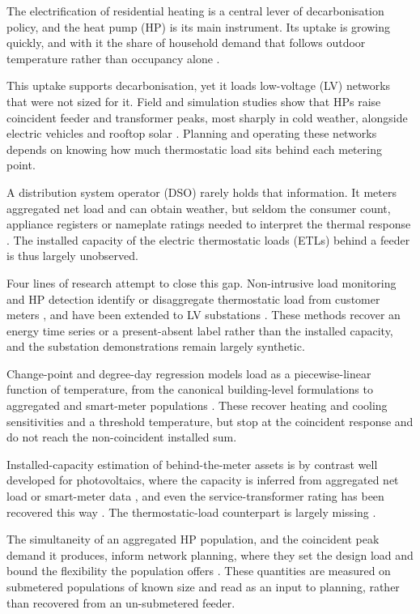 \documentclass[9pt,journal,a4]{IEEEtran}
\begin{document}
The electrification of residential heating is a central lever of decarbonisation policy, and the heat pump (HP) is its main instrument. Its uptake is growing quickly, and with it the share of household demand that follows outdoor temperature rather than occupancy alone \cite{Vel11, Akm14}.

This uptake supports decarbonisation, yet it loads low-voltage (LV) networks that were not sized for it. Field and simulation studies show that HPs raise coincident feeder and transformer peaks, most sharply in cold weather, alongside electric vehicles and rooftop solar \cite{Akm14, Som21, Bec24, Lia26}. Planning and operating these networks depends on knowing how much thermostatic load sits behind each metering point.

A distribution system operator (DSO) rarely holds that information. It meters aggregated net load and can obtain weather, but seldom the consumer count, appliance registers or nameplate ratings needed to interpret the thermal response \cite{Gou26}. The installed capacity of the electric thermostatic loads (ETLs) behind a feeder is thus largely unobserved.

Four lines of research attempt to close this gap. Non-intrusive load monitoring and HP detection identify or disaggregate thermostatic load from customer meters \cite{Fei13, Wei20b, Ray19, Bru23, Gis26}, and have been extended to LV substations \cite{Wan20, Oma24}. These methods recover an energy time series or a present-absent label rather than the installed capacity, and the substation demonstrations remain largely synthetic.

Change-point and degree-day regression models load as a piecewise-linear function of temperature, from the canonical building-level formulations \cite{Fel08, Ruc92, Kis04, Faz16} to aggregated and smart-meter populations \cite{Ali11, Per17b, Mac19}. These recover heating and cooling sensitivities and a threshold temperature, but stop at the coincident response and do not reach the non-coincident installed sum.

Installed-capacity estimation of behind-the-meter assets is by contrast well developed for photovoltaics, where the capacity is inferred from aggregated net load or smart-meter data \cite{Tab18, Was21, Liu22, Azz23b, Gou25}, and even the service-transformer rating has been recovered this way \cite{Azz24}. The thermostatic-load counterpart is largely missing \cite{Gou26}.

The simultaneity of an aggregated HP population, and the coincident peak demand it produces, inform network planning, where they set the design load \cite{Lov17, Che21b, And20, Rou23} and bound the flexibility the population offers \cite{Mul19, Zir19}. These quantities are measured on submetered populations of known size and read as an input to planning, rather than recovered from an un-submetered feeder.
\end{document}
